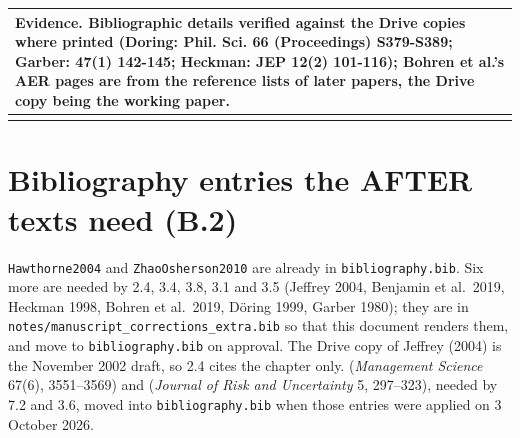 \documentclass[10pt]{article}
\theoremstyle{definition}
\newlength{\fullw}\setlength{\fullw}{25.9cm}
\begin{document}
{\begin{longtable}{|p{0.9cm}|p{12.2cm}|p{12.2cm}|}
\multicolumn{3}{|p{\fullw}|}{\textbf{Evidence.} Bibliographic details verified against the Drive copies where printed (Doring: Phil. Sci. 66 (Proceedings) S379-S389; Garber: 47(1) 142-145; Heckman: JEP 12(2) 101-116); Bohren et al.'s AER pages are from the reference lists of later papers, the Drive copy being the working paper.} \\ \hline
\multicolumn{3}{|l|}{} \\ \hline
\end{longtable}
}

\section*{Bibliography entries the AFTER texts need (B.2)}
\texttt{Hawthorne2004} and \texttt{ZhaoOsherson2010} are already in \texttt{bibliography.bib}.
Six more are needed by 2.4, 3.4, 3.8, 3.1 and 3.5 (Jeffrey 2004, Benjamin et al.\ 2019, Heckman 1998,
Bohren et al.\ 2019, D\"oring 1999, Garber 1980); they are in
\texttt{notes/manuscript\_corrections\_extra.bib} so that this document renders them, and move to
\texttt{bibliography.bib} on approval. The Drive copy of Jeffrey (2004) is the November 2002 draft,
so 2.4 cites the chapter only.
\citet{CoffmanExleyNiederle2021} (\emph{Management Science} 67(6), 3551--3569) and
\citet{TverskyKahneman1992} (\emph{Journal of Risk and Uncertainty} 5, 297--323), needed by
7.2 and 3.6, moved into \texttt{bibliography.bib} when those entries were applied
on 3 October 2026.
\end{document}
